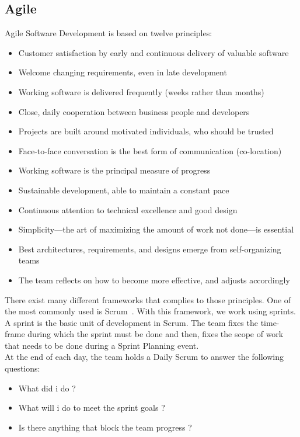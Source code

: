 \documentclass[12pt]{article}
\theoremstyle{definition}
\theoremstyle{definition}
\begin{document}
\subsection{Agile}

Agile Software Development is based on twelve principles:

\begin{itemize}

\item Customer satisfaction by early and continuous delivery of valuable software
\item Welcome changing requirements, even in late development
\item Working software is delivered frequently (weeks rather than months)
\item Close, daily cooperation between business people and developers
\item Projects are built around motivated individuals, who should be trusted
\item Face-to-face conversation is the best form of communication (co-location)
\item Working software is the principal measure of progress
\item Sustainable development, able to maintain a constant pace
\item Continuous attention to technical excellence and good design
\item Simplicity—the art of maximizing the amount of work not done—is essential
\item Best architectures, requirements, and designs emerge from self-organizing teams
\item The team reflects on how to become more effective, and adjusts accordingly

\end{itemize}

There exist many different frameworks that complies to those principles. One of the most commonly used is Scrum~\cite{ScrumAlliance:2017}. With this framework, we work using sprints. A sprint is the basic unit of development in Scrum. The team fixes the time-frame during which the sprint must be done and then, fixes the scope of work that needs to be done during a Sprint Planning event.\\

At the end of each day, the team holds a Daily Scrum to answer the following questions:

\begin{itemize}

\item What did i do ?
\item What will i do to meet the sprint goals ?
\item Is there anything that block the team progress ?

\end{itemize}
\end{document}
